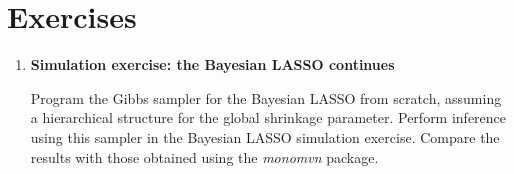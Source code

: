 \section{Exercises}\label{13_7}

\begin{enumerate}
	\item \textbf{Simulation exercise: the Bayesian LASSO continues}
	
	Program the Gibbs sampler for the Bayesian LASSO from scratch, assuming a hierarchical structure for the global shrinkage parameter. Perform inference using this sampler in the Bayesian LASSO simulation exercise. Compare the results with those obtained using the \textit{monomvn} package.

\end{enumerate}

